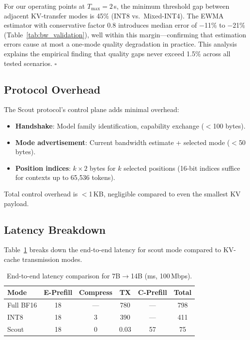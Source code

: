 \documentclass[journal]{IEEEtran}
\begin{document}
For our operating points at $T_{\max} = 2$\,s, the minimum threshold gap between adjacent KV-transfer modes is 45\% (INT8 vs.\ Mixed-INT4).
The EWMA estimator with conservative factor 0.8 introduces median error of $-$11\% to $-$21\% (Table~\ref{tab:bw_validation}), well within this margin---confirming that estimation errors cause at most a one-mode quality degradation in practice.
This analysis explains the empirical finding that quality gaps never exceed 1.5\% across all tested scenarios. \hfill$\square$

\subsection{Protocol Overhead}

The Scout protocol's control plane adds minimal overhead:
\begin{itemize}
    \item \textbf{Handshake}: Model family identification, capability exchange ($<$100 bytes).
    \item \textbf{Mode advertisement}: Current bandwidth estimate + selected mode ($<$50 bytes).
    \item \textbf{Position indices}: $k \times 2$ bytes for $k$ selected positions (16-bit indices suffice for contexts up to 65{,}536 tokens).
\end{itemize}
Total control overhead is $<$1\,KB, negligible compared to even the smallest KV payload.

\subsection{Latency Breakdown}

Table~\ref{tab:scout_latency} breaks down the end-to-end latency for scout mode compared to KV-cache transmission modes.

\begin{table}[t]
\centering
\caption{End-to-end latency comparison for 7B$\to$14B (ms, 100\,Mbps).}
\label{tab:scout_latency}
\small
\begin{tabular}{@{}lccccc@{}}
\toprule
\textbf{Mode} & \textbf{E-Prefill} & \textbf{Compress} & \textbf{TX} & \textbf{C-Prefill} & \textbf{Total} \\
\midrule
Full BF16 & 18 & --- & 780 & --- & 798 \\
INT8      & 18 & 3   & 390 & --- & 411 \\
Scout     & 18 & 0   & 0.03 & 57 & 75 \\
\bottomrule
\end{tabular}
\end{table}
\end{document}
